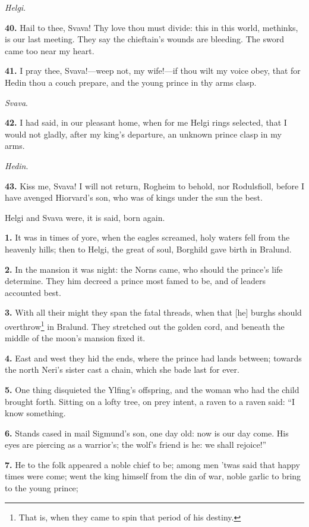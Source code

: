 \emph{Helgi}.

\textbf{40.} Hail to thee, Svava! Thy love thou must divide: this in this
world, methinks, is our last meeting. They say the chieftain's wounds
are bleeding. The sword came too near my heart.

\textbf{41.} I pray thee, Svava!—weep not, my wife!—if thou wilt my voice
obey, that for Hedin thou a couch prepare, and the young prince in thy
arms clasp.

\emph{Svava}.

\textbf{42.} I had said, in our pleasant home, when for me Helgi rings
selected, that I would not gladly, after my king's departure, an
unknown prince clasp in my arms.

\emph{Hedin}.

\textbf{43.} Kiss me, Svava! I will not return, Rogheim to behold, nor
Rodulsfioll, before I have avenged Hiorvard's son, who was of kings
under the sun the best.

Helgi and Svava were, it is said, born again.


\textbf{1.} It was in times of yore, when the eagles screamed, holy waters
fell from the heavenly hills; then to Helgi, the great of soul,
Borghild gave birth in Bralund.

\textbf{2.} In the mansion it was night: the Norns came, who should the
prince's life determine. They him decreed a prince most famed to be,
and of leaders accounted best.

\textbf{3.} With all their might they span the fatal threads, when that [he]
burghs should overthrow\footnote{That is, when they came to spin that period of his
destiny.} in Bralund. They stretched out the golden
cord, and beneath the middle of the moon's mansion fixed it.

\textbf{4.} East and west they hid the ends, where the prince had lands
between; towards the north Neri's sister cast a chain, which she bade
last for ever.

\textbf{5.} One thing disquieted the Ylfing's offspring, and the woman who
had the child brought forth. Sitting on a lofty tree, on prey intent,
a raven to a raven said: ``I know something.

\textbf{6.} Stands cased in mail Sigmund's son, one day old: now is our day
come. His eyes are piercing as a warrior's; the wolf's friend is he:
we shall rejoice!''

\textbf{7.} He to the folk appeared a noble chief to be; among men 'twas said
that happy times were come; went the king himself from the din of war,
noble garlic to bring to the young prince;

